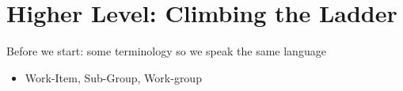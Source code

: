 
\section{Higher Level: Climbing the Ladder}

\begin{frame}{Before we start: some terminology so we speak the same language}
    \begin{itemize}
        \item Work-Item, Sub-Group, Work-group
    \end{itemize}
\end{frame}

